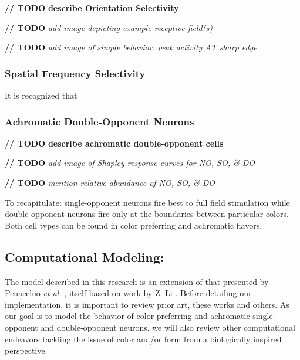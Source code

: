 \documentclass[journal,onecolumn]{IEEEtran}
\begin{document}
\textbf{// TODO} \textbf{describe Orientation Selectivity}

\textbf{// TODO} \textit{add image depicting example receptive field(s)}

\textbf{// TODO} \textit{add image of simple behavior: peak activity AT sharp edge}


\subsubsection*{Spatial Frequency Selectivity}

It is recognized that


\subsubsection*{Achromatic Double-Opponent Neurons}

\textbf{// TODO} \textbf{describe achromatic double-opponent cells}



\textbf{// TODO} \textit{add image of Shapley response curves for NO, SO, \& DO}

\textbf{// TODO} \textit{mention relative abundance of NO, SO, \& DO}

To recapitulate: single-opponent neurons fire best to full field stimulation while double-opponent neurons fire only at the boundaries between particular colors. Both cell types can be found in color preferring and achromatic flavors.


\subsection{Computational Modeling:}

The model described in this research is an extension of that presented by Penacchio \textit{et al.} \cite{otazu:plosone}, itself based on work by Z. Li \cite{li:1998, li:1999}. Before detailing our implementation, it is important to review prior art, these works and others. As our goal is to model the behavior of color preferring and achromatic single-opponent and double-opponent neurons, we will also review other computational endeavors tackling the issue of color and/or form from a biologically inspired perspective.
\end{document}
